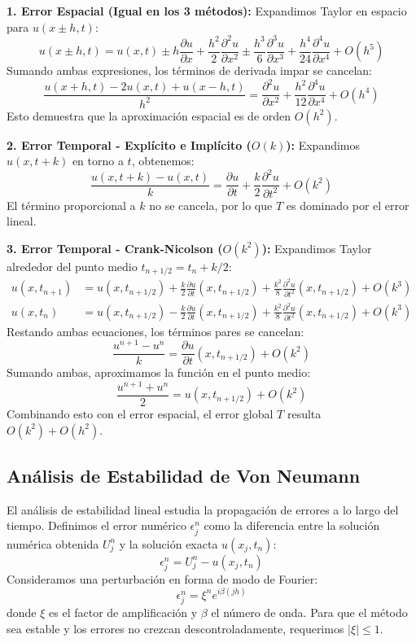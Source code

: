 \documentclass{article}
\begin{document}
\noindent \textbf{1. Error Espacial (Igual en los 3 métodos):}
Expandimos Taylor en espacio para \(u(x\pm h, t)\):
\[ u(x\pm h, t) = u(x,t) \pm h \frac{\partial u}{\partial x} + \frac{h^2}{2} \frac{\partial^2 u}{\partial x^2} \pm \frac{h^3}{6} \frac{\partial^3 u}{\partial x^3} + \frac{h^4}{24} \frac{\partial^4 u}{\partial x^4} + O(h^5) \]
Sumando ambas expresiones, los términos de derivada impar se cancelan:
\[ \frac{u(x+h, t) - 2u(x,t) + u(x-h, t)}{h^2} = \frac{\partial^2 u}{\partial x^2} + \frac{h^2}{12} \frac{\partial^4 u}{\partial x^4} + O(h^4) \]
Esto demuestra que la aproximación espacial es de orden \(O(h^2)\).

\vspace{0.2cm}
\noindent \textbf{2. Error Temporal - Explícito e Implícito (\(O(k)\)):}
Expandimos \(u(x, t+k)\) en torno a \(t\), obtenemos:
\[ \frac{u(x, t+k)-u(x, t)}{k} = \frac{\partial u}{\partial t} + \frac{k}{2}\frac{\partial^2 u}{\partial t^2} + O(k^2) \]
El término proporcional a \(k\) no se cancela, por lo que \(T\) es dominado por el error lineal.

\vspace{0.2cm}
\noindent \textbf{3. Error Temporal - Crank-Nicolson (\(O(k^2)\)):}
Expandimos Taylor alrededor del punto medio \(t_{n+1/2} = t_n + k/2\):
\begin{align*}
	u(x, t_{n+1}) & = u(x, t_{n+1/2}) + \frac{k}{2} \frac{\partial u}{\partial t}(x, t_{n+1/2}) + \frac{k^2}{8} \frac{\partial^2 u}{\partial t^2}(x, t_{n+1/2}) + O(k^3) \\
	u(x, t_{n})   & = u(x, t_{n+1/2}) - \frac{k}{2} \frac{\partial u}{\partial t}(x, t_{n+1/2}) + \frac{k^2}{8} \frac{\partial^2 u}{\partial t^2}(x, t_{n+1/2}) + O(k^3)
\end{align*}
Restando ambas ecuaciones, los términos pares se cancelan:
\[ \frac{u^{n+1} - u^n}{k} = \frac{\partial u}{\partial t}(x, t_{n+1/2}) + O(k^2) \]
Sumando ambas, aproximamos la función en el punto medio:
\[ \frac{u^{n+1} + u^n}{2} = u(x, t_{n+1/2}) + O(k^2) \]
Combinando esto con el error espacial, el error global \(T\) resulta \(O(k^2) + O(h^2)\).

\subsection{Análisis de Estabilidad de Von Neumann}
El análisis de estabilidad lineal estudia la propagación de errores a lo largo del tiempo. Definimos el error numérico \(\epsilon_j^n\) como la diferencia entre la solución numérica obtenida \(U_j^n\) y la solución exacta \(u(x_j, t_n)\):
\[
	\epsilon_j^n = U_j^n - u(x_j, t_n)
\]
Consideramos una perturbación en forma de modo de Fourier:
\[
	\epsilon_j^n = \xi^n e^{i \beta (jh)}
\]
donde \(\xi\) es el factor de amplificación y \(\beta\) el número de onda. Para que el método sea estable y los errores no crezcan descontroladamente, requerimos \( |\xi| \le 1 \).
\end{document}
